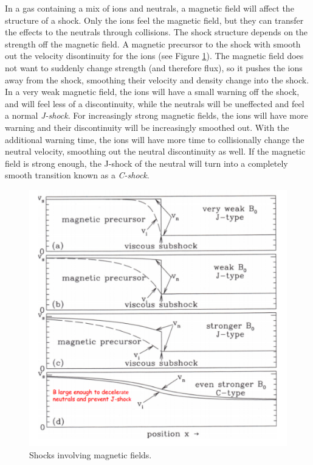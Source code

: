 In a gas containing a mix of ions and neutrals, a magnetic field will affect 
the structure of a shock.  Only the ions feel the magnetic field, but they 
can transfer the effects to the neutrals through collisions.  The shock 
structure depends on the strength off the magnetic field.  A magnetic 
precursor to the shock with smooth out the velocity disontinuity for the ions 
(see Figure \ref{fig:Cshock}).  The magnetic field does not want to 
suddenly change strength (and therefore flux), so it pushes the ions away from 
the shock, smoothing their velocity and density change into the shock.  
In a very weak magnetic field, the ions will 
have a small warning off the shock, and will feel less of a discontinuity, 
while the neutrals will be uneffected and feel a normal \emph{J-shock}.  For 
increasingly strong magnetic fields, the ions will have more warning and 
their discontinuity will be increasingly smoothed out.  With the additional 
warning time, the ions will have more time to collisionally change the 
neutral velocity, smoothing out the neutral discontinuity as well.  If the 
magnetic field is strong enough, the J-shock of the neutral will turn into 
a completely smooth transition known as a \emph{C-shock}.

\begin{figure}[!h]
\begin{center}
\includegraphics[width=\textwidth]{Cshock.pdf}
\end{center}
\caption{Shocks involving magnetic fields. \label{fig:Cshock}}
\end{figure}


